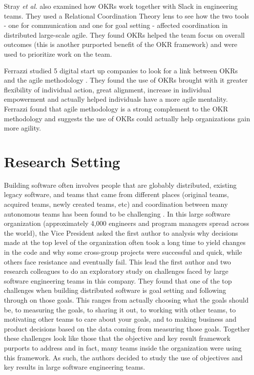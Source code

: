 \documentclass[sigconf, nonacm]{acmart}
\begin{document}
Stray \textit{et al.} also examined how OKRs work together with Slack in engineering teams. They used a Relational Coordination Theory lens to see how the two tools - one for communication and one for goal setting - affected coordination in distributed large-scale agile. They found OKRs helped the team focus on overall outcomes (this is another purported benefit of the OKR framework) and were used to prioritize work on the team. 

Ferrazzi studied 5 digital start up companies to look for a link between OKRs and the agile methodology \cite{ferrazzi}. They found the use of OKRs brought with it greater flexibility of individual action, great alignment, increase in individual empowerment and actually helped individuals have a more agile mentality. Ferrazzi found that agile methodology is a strong complement to the OKR methodology and suggests the use of OKRs could actually help organizations gain more agility. 


\section{Research Setting}%
Building software often involves people that are globably distributed, existing legacy software, and teams that came from different places (original teams, acquired teams, newly created teams, etc) and coordination between many autonomous teams has been found to be challenging \cite{Paasivaara}.  In this large software organization (approximately 4,000 engineers and program managers spread across the world), the Vice President asked the first author to analysis why decisions made at the top level of the organization often took a long time to yield changes in the code and why some cross-group projects were successful and quick, while others face resistance and eventually fail. This lead the first author and two research colleagues to do an exploratory study on challenges faced by large software engineering teams in this company. They found that one of the top challenges when building distributed software is goal setting and following through on those goals. This ranges from actually choosing what the goals should be, to measuring the goals, to sharing it out, to working with other teams, to motivating other teams to care about your goals, and to making business and product decisions based on the data coming from measuring those goals. Together these challenges look like those that the objective and key result framework purports to address and in fact, many teams inside the organization were using this framework. As such, the authors decided to study the use of objectives and key results in large software engineering teams.
\end{document}
